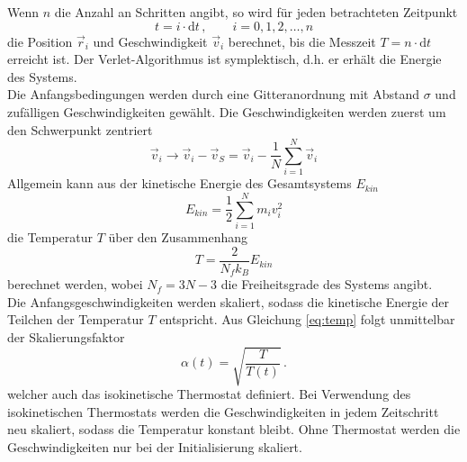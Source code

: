 Wenn $n$ die Anzahl an Schritten angibt, so wird für jeden betrachteten Zeitpunkt
\begin{equation*}
    t = i \cdot \mathrm{d}t \, ,  \qquad i = 0, 1, 2, \dots, n
\end{equation*}
die Position $\vec{r}_i$ und Geschwindigkeit $\vec{v}_i$ berechnet, bis die Messzeit $T = n \cdot \mathrm{d}t$ erreicht ist.
Der Verlet-Algorithmus ist symplektisch, d.h. er erhält die Energie des Systems.
\\
Die Anfangsbedingungen werden durch eine Gitteranordnung mit Abstand $\sigma$ und zufälligen Geschwindigkeiten gewählt.
Die Geschwindigkeiten werden zuerst um den Schwerpunkt zentriert
\begin{equation}
    \vec{v}_i \rightarrow \vec{v}_i - \vec{v}_S = \vec{v}_i - \frac{1}{N} \sum_{i=1}^N \vec{v}_i
\end{equation}
Allgemein kann aus der kinetische Energie des Gesamtsystems $E_{kin}$
\begin{equation}
    E_{kin} = \frac{1}{2} \sum_{i=1}^N m_i v_i^2
\end{equation}
die Temperatur $T$ über den Zusammenhang
\begin{equation}
    T = \frac{2}{N_f k_B} E_{kin}
    \label{eq:temp}
\end{equation}
berechnet werden, wobei $N_f = 3N-3$ die Freiheitsgrade des Systems angibt.
\\
Die Anfangsgeschwindigkeiten werden skaliert, sodass die kinetische Energie der Teilchen der Temperatur $T$ entspricht.
Aus Gleichung \eqref{eq:temp} folgt unmittelbar der Skalierungsfaktor
\begin{equation}
    \alpha(t) = \sqrt{\frac{T}{T(t)}} \,.
    \label{eq:isokin}
\end{equation}
welcher auch das isokinetische Thermostat definiert.
Bei Verwendung des isokinetischen Thermostats werden die Geschwindigkeiten in jedem Zeitschritt neu skaliert, sodass die Temperatur konstant bleibt.
Ohne Thermostat werden die Geschwindigkeiten nur bei der Initialisierung skaliert.

